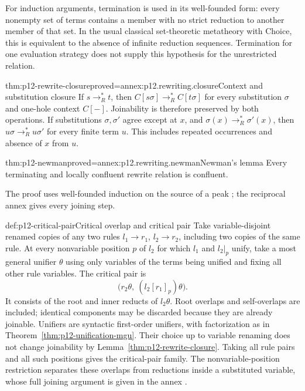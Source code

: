 For induction arguments, termination is used in its well-founded form:
every nonempty set of terms contains a member with no strict reduction to
another member of that set. In the usual classical set-theoretic metatheory
with Choice, this is equivalent to the absence of infinite reduction
sequences. Termination for one evaluation strategy does not supply this
hypothesis for the unrestricted relation.

\begin{hblemma}{thm:p12-rewrite-closure}{proved=annex:p12.rewriting.closure}{Context and substitution closure}
If \(s\to_R^*t\), then \(C[s\sigma]\to_R^*C[t\sigma]\)
for every substitution \(\sigma\) and one-hole context \(C[-]\).
Joinability is therefore preserved by both operations. If substitutions
\(\sigma,\sigma'\) agree except at \(x\), and
\(\sigma(x)\to_R^*\sigma'(x)\), then
\(u\sigma\to_R^*u\sigma'\) for every finite term \(u\).
This includes repeated occurrences and absence of \(x\) from \(u\).
\end{hblemma}

\begin{hbtheorem}{thm:p12-newman}{proved=annex:p12.rewriting.newman}{Newman's lemma}
Every terminating and locally confluent rewrite relation is confluent.
\end{hbtheorem}

The proof uses well-founded induction on the source of a peak
\cite{Newman1942}; the reciprocal annex gives every joining step.

\begin{hbdefinition}{def:p12-critical-pair}{Critical overlap and critical pair}
Take variable-disjoint renamed copies of any two rules
\(l_1\to r_1\), \(l_2\to r_2\), including two copies of the same
rule. At every nonvariable position \(p\) of \(l_2\) for which
\(l_1\) and \(l_2|_p\) unify, take a most general unifier
\(\theta\) using only variables of the terms being unified and
fixing all other rule variables. The critical pair is
\[
 \bigl(r_2\theta,\ (l_2[r_1]_p)\theta\bigr).
\]
It consists of the root and inner reducts of \(l_2\theta\).
Root overlaps and self-overlaps are included; identical components may
be discarded because they are already joinable. Unifiers are syntactic
first-order unifiers, with factorization as in
Theorem~\ref{thm:p12-unification-mgu}. Their choice up to variable
renaming does not change joinability by Lemma~\ref{thm:p12-rewrite-closure}.
Taking all rule pairs and all such positions gives the critical-pair family.
The nonvariable-position restriction separates these overlaps from
reductions inside a substituted variable, whose full joining argument is
given in the annex \cite[lem.~3.1]{Huet1980}
\cite[p.~2]{Lucas2024LocalConfluence}.
\end{hbdefinition}

